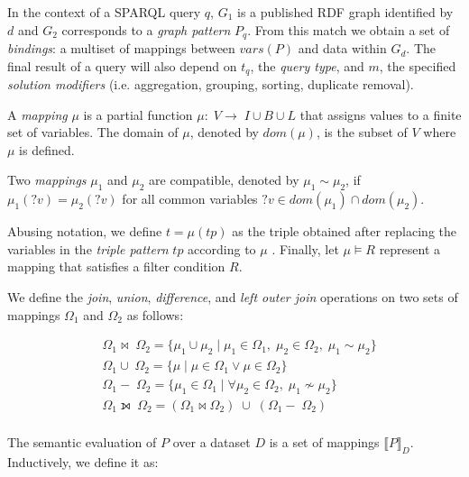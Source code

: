 In the context of a \gls{SPARQL} query $q$, $G_1$ is a published \gls{RDF} graph identified by $d$ and $G_2$ corresponds to a \emph{graph pattern} $P_q$. From this match we obtain a set of \emph{bindings}: a multiset of mappings between $vars(P)$ and data within $G_d$. The final result of a query will also depend on $t_q$, the \emph{query type}, and $m$, the specified \emph{solution modifiers} (i.e. aggregation, grouping, sorting, duplicate removal). 

\begin{definition} A \emph{mapping} $\mu$ is a partial function $\mu : \; V \to \; I \cup B \cup L$ that assigns values to a finite set of variables. The domain of $\mu$, denoted by $dom(\mu)$, is the subset of $V$ where $\mu$ is defined. 

Two \emph{mappings} $\mu_1$ and $\mu_2$ are compatible, denoted by $\mu_1 \sim \mu_2$, if $\mu_1(?v) = \mu_2(?v)$ for all common variables $?v \in dom(\mu_1) \cap dom(\mu_2)$.

Abusing notation, we define $t = \mu(tp)$ as the triple obtained after replacing the variables in the \emph{triple pattern} $tp$ according to $\mu$ \autocite{Letelier2013-rs, Picalausa2011-ca}. Finally, let $\mu \vDash R$ represent a mapping that satisfies a filter condition $R$.

We define the \emph{join}, \emph{union}, \emph{difference}, and \emph{left outer join} operations on two sets of mappings $\Omega_1$ and $\Omega_2$ as follows:

\begin{equation}
    \begin{split} 
    & \Omega_1 \Join \; \Omega_2 = \{ \mu_1 \cup \mu_2 \;\vert\; \mu_1 \in \Omega_1 ,\; \mu_2 \in \Omega_2,\; \mu_1 \sim \mu_2 \} \\ 
    & \Omega_1 \cup \; \Omega_2 = \{ \mu \;\vert\; \mu \in \Omega_1 \vee \mu \in \Omega_2 \} \\
    & \Omega_1 - \; \Omega_2 = \{ \mu_1 \in \Omega_1 \;\vert\; \forall \mu_2 \in \Omega_2,\; \mu_1 \nsim \mu_2 \} \\
    & \Omega_1 \leftouterjoin \; \Omega_2 = (\Omega_1 \Join \Omega_2) \; \cup \; (\Omega_1 - \; \Omega_2) \\
    \end{split}
\end{equation}

The semantic evaluation of $P$ over a dataset $D$ is a set of mappings $\llbracket P \rrbracket_D$. Inductively, we define it as:


\end{definition}
